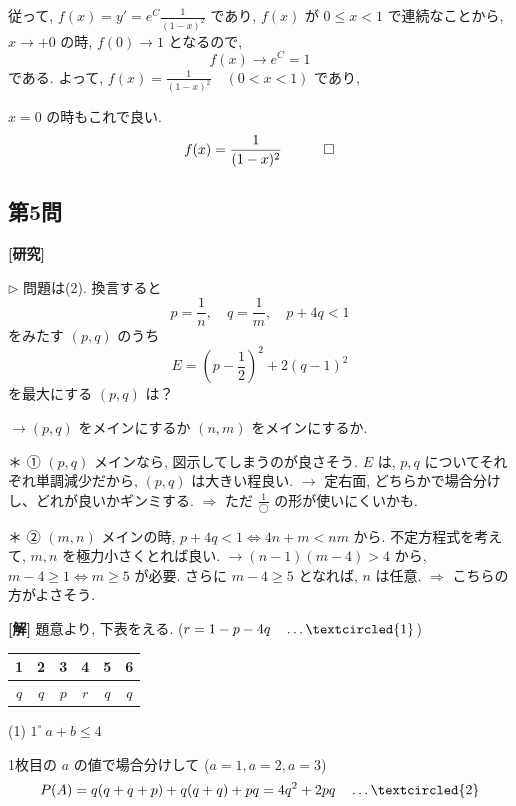\documentclass[../main.tex]{subfiles}
\begin{document}
\noindent
従って, $f(x) = y' = e^C \frac{1}{(1-x)^2}$ であり, $f(x)$ が $0 \le x < 1$ で連続なことから, $x \to +0$ の時, $f(0) \to 1$ となるので,
\[
  f(x) \to e^C = 1
\]
である. よって, $f(x) = \frac{1}{(1-x)^2} \quad (0 < x < 1)$ であり,

\noindent
$x = 0$ の時もこれで良い.
\[
  f(x) = \frac{1}{(1-x)^2} \quad \hfill \qed
\]

\newpage

\subsection*{第5問}

\noindent
\textbf{[研究]}

\noindent
$\triangleright$ 問題は(2). 換言すると
\[
  p = \frac{1}{n}, \quad q = \frac{1}{m}, \quad p+4q < 1
\]
をみたす $(p,q)$ のうち
\[
  E = \left(p - \frac{1}{2}\right)^2 + 2(q-1)^2
\]
を最大にする $(p,q)$ は？

\medskip

\noindent
$\to (p,q)$ をメインにするか $(n,m)$ をメインにするか.

\noindent
＊ ① $(p,q)$ メインなら, 図示してしまうのが良さそう.
$E$ は, $p,q$ についてそれぞれ単調減少だから, $(p,q)$ は大きい程良い.
$\to$ 定右面, どちらかで場合分けし、どれが良いかギンミする.
$\Rightarrow$ ただ $\frac{1}{\text{◯}}$ の形が使いにくいかも.

\noindent
＊ ② $(m,n)$ メインの時, $p+4q < 1 \iff 4n+m < nm$ から.
不定方程式を考えて, $m,n$ を極力小さくとれば良い.
$\longrightarrow (n-1)(m-4) > 4$ から, $m-4 \ge 1 \iff m \ge 5$ が必要.
さらに $m-4 \ge 5$ となれば, $n$ は任意.
$\Rightarrow$ こちらの方がよさそう.

\bigskip

\noindent
\textbf{[解]} 題意より, 下表をえる. ($r = 1 - p - 4q \quad \dots \textcircled{1}$)

\begin{center}
  \begin{tabular}{|c|c|c|c|c|c|}
    \hline
    1 & 2 & 3 & 4 & 5 & 6 \\ \hline
    $q$ & $q$ & $p$ & $r$ & $q$ & $q$ \\ \hline
  \end{tabular}
\end{center}

\noindent
(1) $1^\circ \ a+b \le 4$

\noindent
1枚目の $a$ の値で場合分けして ($a=1, a=2, a=3$)
\[
  P(A) = q(q+q+p) + q(q+q) + pq = 4q^2 + 2pq \quad \dots \textcircled{2}
\]
\end{document}
